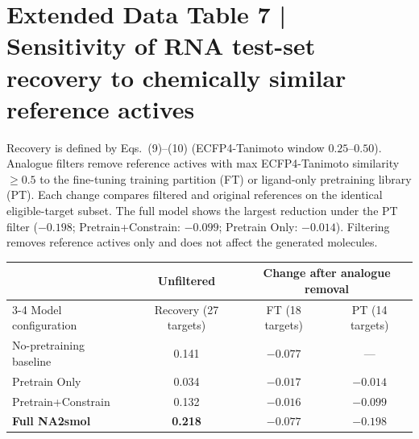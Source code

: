 \section*{Extended Data Table 7 | Sensitivity of RNA test-set recovery to chemically similar reference actives}
Recovery is defined by Eqs.~(9)--(10) (ECFP4-Tanimoto window $0.25$--$0.50$). Analogue filters remove reference actives with max ECFP4-Tanimoto similarity $\geq0.5$ to the fine-tuning training partition (FT) or ligand-only pretraining library (PT). Each change compares filtered and original references on the identical eligible-target subset. The full model shows the largest reduction under the PT filter ($-0.198$; Pretrain+Constrain: $-0.099$; Pretrain Only: $-0.014$). Filtering removes reference actives only and does not affect the generated molecules.

\begin{center}\footnotesize
\setlength{\tabcolsep}{5pt}
\begin{tabular}{@{}lccc@{}}
\toprule
 & Unfiltered & \multicolumn{2}{c}{Change after analogue removal} \\
\cmidrule(lr){3-4}
Model configuration & Recovery (27 targets) & FT (18 targets) & PT (14 targets) \\
\midrule
No-pretraining baseline & 0.141 & $-0.077$ & --- \\
Pretrain Only & 0.034 & $-0.017$ & $-0.014$ \\
Pretrain+Constrain & 0.132 & $-0.016$ & $-0.099$ \\
\textbf{Full NA2smol} & \textbf{0.218} & $-0.077$ & $-0.198$ \\
\bottomrule
\end{tabular}
\end{center}
